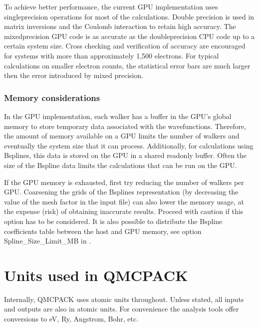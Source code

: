 \documentclass[letterpaper,10pt,english]{sphinxmanual}
\begin{document}
To achieve better performance, the current GPU implementation uses
single\sphinxhyphen{}precision operations for most of the calculations. Double
precision is used in matrix inversions and the Coulomb interaction to
retain high accuracy. The mixed\sphinxhyphen{}precision GPU code is as accurate as
the double\sphinxhyphen{}precision CPU code up to a certain system size. Cross
checking and verification of accuracy are encouraged for systems with
more than approximately 1,500 electrons. For typical calculations on
smaller electron counts, the statistical error bars are much larger
then the error introduced by mixed precision.


\subsection{Memory considerations}
\label{\detokenize{running:id3}}
In the GPU implementation, each walker has a buffer in the GPU’s
global memory to store temporary data associated with the
wavefunctions. Therefore, the amount of memory available on a GPU
limits the number of walkers and eventually the system size that it
can process. Additionally, for calculations using B\sphinxhyphen{}splines, this data
is stored on the GPU in a shared read\sphinxhyphen{}only buffer. Often the size of the
B\sphinxhyphen{}spline data limits the calculations that can be run on the GPU.

If the GPU memory is exhausted, first try reducing the number of walkers per GPU.
Coarsening the grids of the B\sphinxhyphen{}splines representation (by decreasing
the value of the mesh factor in the input file) can also lower the memory
usage, at the expense (risk) of obtaining inaccurate results. Proceed
with caution if this option has to be considered.  It is also possible
to distribute the B\sphinxhyphen{}spline coefficients table between the host and GPU
memory, see option Spline\_Size\_Limit\_MB in
{\hyperref[\detokenize{intro_wavefunction:spo-spline}]{}}.




\chapter{Units used in QMCPACK}
\label{\detokenize{units:units-used-in-qmcpack}}\label{\detokenize{units:units}}\label{\detokenize{units::doc}}
Internally, QMCPACK uses atomic units throughout. Unless stated, all inputs and outputs are also in atomic units. For convenience the analysis tools offer conversions to eV, Ry, Angstrom, Bohr, etc.
\end{document}
